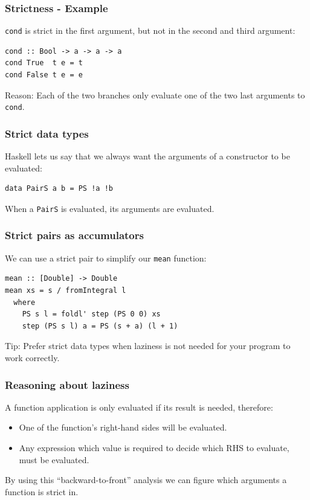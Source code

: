 \documentclass{beamer}
\begin{document}
\begin{frame}[fragile]
  \frametitle{Strictness - Example}

  \lstinline!cond! is strict in the first argument, but not in the
  second and third argument:
  \begin{lstlisting}
cond :: Bool -> a -> a -> a
cond True  t e = t
cond False t e = e
  \end{lstlisting}
  Reason: Each of the two branches only evaluate one of the two last
  arguments to \lstinline!cond!.
\end{frame}

\begin{frame}[fragile]
  \frametitle{Strict data types}

  Haskell lets us say that we always want the arguments of a
  constructor to be evaluated:

\begin{lstlisting}
data PairS a b = PS !a !b
\end{lstlisting}

  When a \lstinline!PairS! is evaluated, its arguments are evaluated.
\end{frame}

\begin{frame}[fragile]
  \frametitle{Strict pairs as accumulators}

  We can use a strict pair to simplify our \lstinline!mean! function:

  \begin{lstlisting}
mean :: [Double] -> Double
mean xs = s / fromIntegral l
  where
    PS s l = foldl' step (PS 0 0) xs
    step (PS s l) a = PS (s + a) (l + 1)
  \end{lstlisting}

  Tip: Prefer strict data types when laziness is not needed for your
  program to work correctly.

\end{frame}

\begin{frame}[fragile]
  \frametitle{Reasoning about laziness}

  A function application is only evaluated if its result is needed,
  therefore:
  \begin{itemize}
  \item One of the function's right-hand sides will be evaluated.
  \item Any expression which value is required to decide which RHS to
    evaluate, must be evaluated.
  \end{itemize}
  By using this ``backward-to-front'' analysis we can figure which
  arguments a function is strict in.
\end{frame}
\end{document}
